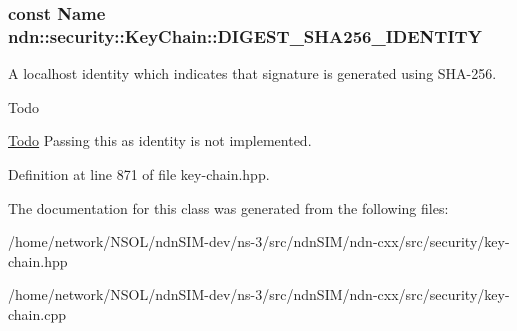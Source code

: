 \subsubsection[{\texorpdfstring{D\+I\+G\+E\+S\+T\+\_\+\+S\+H\+A256\+\_\+\+I\+D\+E\+N\+T\+I\+TY}{DIGEST\_SHA256\_IDENTITY}}]{\setlength{\rightskip}{0pt plus 5cm}const {\bf Name} ndn\+::security\+::\+Key\+Chain\+::\+D\+I\+G\+E\+S\+T\+\_\+\+S\+H\+A256\+\_\+\+I\+D\+E\+N\+T\+I\+TY\hspace{0.3cm}{\ttfamily [static]}}\hypertarget{classndn_1_1security_1_1KeyChain_adf4f8fd3353671ac77f02b94530620b1}{}\label{classndn_1_1security_1_1KeyChain_adf4f8fd3353671ac77f02b94530620b1}


A localhost identity which indicates that signature is generated using S\+H\+A-\/256. 

\begin{DoxyRefDesc}{Todo}
\item[\hyperlink{todo__todo000008}{Todo}]Passing this as identity is not implemented. \end{DoxyRefDesc}


Definition at line 871 of file key-\/chain.\+hpp.



The documentation for this class was generated from the following files\+:\begin{DoxyCompactItemize}
\item 
/home/network/\+N\+S\+O\+L/ndn\+S\+I\+M-\/dev/ns-\/3/src/ndn\+S\+I\+M/ndn-\/cxx/src/security/key-\/chain.\+hpp\item 
/home/network/\+N\+S\+O\+L/ndn\+S\+I\+M-\/dev/ns-\/3/src/ndn\+S\+I\+M/ndn-\/cxx/src/security/key-\/chain.\+cpp\end{DoxyCompactItemize}
